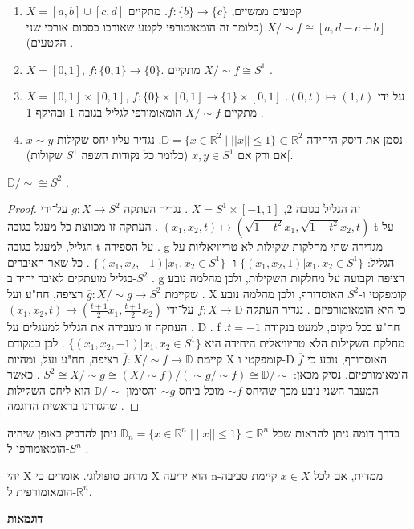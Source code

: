 \documentclass{tstextbook}
\begin{document}
\begin{enumerate}
  \item \(X=[a,b]\cup[c,d]\) קטעים ממשיים, \(f:\{b\}\rightarrow\{c\}\). מתקיים \(X/\sim f\cong [a,d-c+b]\) (כלומר זה הומאומורפי לקטע שאורכו כסכום אורכי שני הקטעים) . 


  \item \(X=[0,1]\), \(f:\{0,1\}\rightarrow\{0\}\). מתקיים \(X/\sim f\cong S^{1}\) . 


  \item \(X=[0,1]\times[0,1]\), \(f:\{0\}\times[0,1]\rightarrow\{1\}\times[0,1]\) על ידי \((0,t)\mapsto(1,t)\). מתקיים \(X/\sim f\) הומאומורפי לגליל בגובה 1 ובהיקף 1 . 


  \item נסמן את דיסק היחידה \(\mathbb{D}=\{x\in\mathbb{R}^{2} \mid ||x||\le1\}\subset\mathbb{R}^{2}\). נגדיר עליו יחס שקילות \(x\sim y\) אם ורק אם \(x,y\in S^{1}\) (כלומר כל נקודות השפה \(S^{1}\) שקולות)[. 


\end{enumerate}
\begin{proposition}
\(\mathbb{D}/\sim\cong S^{2}\) .

\end{proposition}
\begin{proof}
זה הגליל בגובה 2, \(X=S^{1}\times[-1,1]\) . נגדיר העתקה \(g:X\rightarrow S^{2}\) על־ידי \((x_{1},x_{2},t)\mapsto(\sqrt{1-t^{2}}x_{1},\sqrt{1-t^{2}}x_{2},t)\) . העתקה זו מכווצת כל מעגל בגובה t על הגליל, למעגל בגובה t על הספירה .
g מגדירה שתי מחלקות שקילות לא טריוויאליות על הגליל: \(\{(x_{1},x_{2},1)|x_{1},x_{2}\in S^{1}\}\) ו- \(\{(x_{1},x_{2},-1)|x_{1},x_{2}\in S^{1}\}\) . כל שאר האיברים בגליל מועתקים לאיבר יחיד ב-\(S^{2}\) .
g רציפה וקבועה על מחלקות השקילות, ולכן מהלמה נובע שקיימת \(\overline{g}: X/\sim g\rightarrow S^{2}\) רציפה, חח"ע ועל . X קומפקטי ו-\(S^2\) האוסדורף, ולכן מהלמה נובע כי היא הומאומורפיזם .
נגדיר העתקה \(f:X\rightarrow\mathbb{D}\) על־ידי \((x_{1},x_{2},t)\mapsto(\frac{t+1}{2}x_{1},\frac{t+1}{2}x_{2})\) . העתקה זו מעבירה את הגליל למעגלים על D .
f חח"ע בכל מקום, למעט בנקודה \(t=-1\). מחלקת השקילות הלא טריוויאלית היחידה היא \(\{(x_{1},x_{2},-1)|x_{1},x_{2}\in S^{1}\}\) .
לכן כמקודם קיימת \(\overline{f}:X/\sim f\rightarrow\mathbb{D}\) רציפה, חח"ע ועל, ומהיות X קומפקטי ו-D האוסדורף, נובע כי \(\overline{f}\) הומאומורפיזם.
נסיק מכאן: \(S^{2}\cong X/\sim g\cong(X/\sim f)/(\sim g/\sim f)\cong\mathbb{D}/\sim\) .
כאשר המעבר השני נובע מכך שהיחס \(\sim f\) מוכל ביחס \(\sim g\) והסימון \(\mathbb{D}/\sim\) הוא ליחס השקילות שהגדרנו בראשית הדוגמה .

\end{proof}
\begin{remark}
בדרך דומה ניתן להראות שכל \(\mathbb{D}_{n}=\{x\in\mathbb{R}^{n} \mid ||x||\le1\}\subset\mathbb{R}^{n}\) ניתן להדביק באופן שיהיה הומאומורפי ל-\(S^n\) .

\end{remark}
\begin{definition}
יהי X מרחב טופולוגי. אומרים כי X הוא יריעה n-ממדית, אם לכל \(x\in X\) קיימת סביבה הומאומורפית ל-\(\mathbb{R}^n\).

\end{definition}
\textbf{דוגמאות}
\end{document}
